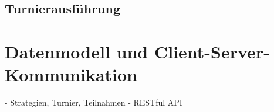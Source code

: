 \subsection{Turnierausführung}


\section{Datenmodell und Client-Server-Kommunikation}

- Strategien, Turnier, Teilnahmen - RESTful API
